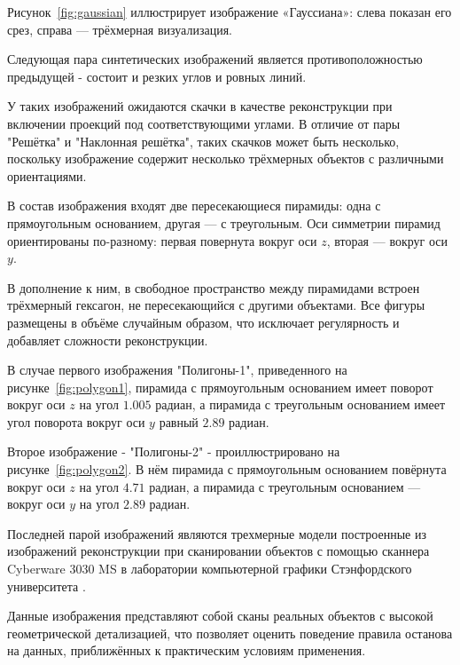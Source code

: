 Рисунок~\ref{fig:gaussian} иллюстрирует изображение «Гауссиана»: слева показан его срез, справа — трёхмерная визуализация.


Следующая пара синтетических изображений является противоположностью предыдущей - состоит и резких углов и ровных линий.

У таких изображений ожидаются скачки в качестве реконструкции при включении проекций под соответствующими углами. В отличие от пары "Решётка" и "Наклонная решётка", таких скачков может быть несколько, поскольку изображение содержит несколько трёхмерных объектов с различными ориентациями.

В состав изображения входят две пересекающиеся пирамиды: одна с прямоугольным основанием, другая — с треугольным. Оси симметрии пирамид ориентированы по-разному: первая повернута вокруг оси \(z\), вторая — вокруг оси \(y\). 

В дополнение к ним, в свободное пространство между пирамидами встроен трёхмерный гексагон, не пересекающийся с другими объектами. Все фигуры размещены в объёме случайным образом, что исключает регулярность и добавляет сложности реконструкции.

В случае первого изображения "Полигоны-1", приведенного на рисунке~\ref{fig:polygon1}, пирамида с прямоугольным основанием имеет поворот вокруг оси \(z\) на угол \(1.005\) радиан, а пирамида с треугольным основанием имеет угол поворота вокруг оси \(y\) равный \(2.89\) радиан.


Второе изображение - "Полигоны-2" - проиллюстрировано на рисунке~\ref{fig:polygon2}. В нём пирамида с прямоугольным основанием повёрнута вокруг оси \(z\) на угол \(4.71\) радиан, а пирамида с треугольным основанием — вокруг оси \(y\) на угол \(2.89\) радиан.


Последней парой изображений являются трехмерные модели построенные из изображений реконструкции при сканировании  объектов с помощью сканнера  Cyberware 3030 MS в лаборатории компьютерной графики Стэнфордского университета \cite{stanfordRepository}.

Данные изображения представляют собой сканы реальных объектов с высокой геометрической детализацией, что позволяет оценить поведение правила останова на данных, приближённых к практическим условиям применения.

